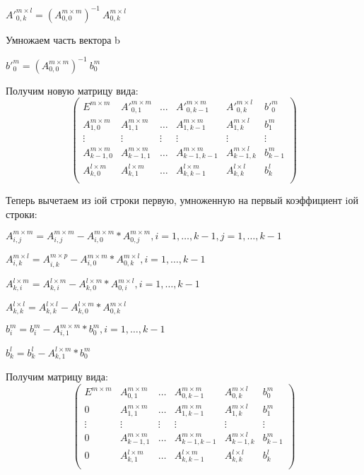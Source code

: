 \documentclass[12pt]{scrreprt}
\begin{document}
${A'}_{0, k}^{m \times l} = (A_{0, 0}^{m \times m})^{-1} \ A_{0, k}^{m \times l}$

Умножаем часть вектора b

${b'}_{0}^{m} = (A_{0, 0}^{m \times m})^{-1} \ b_{0}^{m}$

Получим новую матрицу вида:
\[ \left( \begin{matrix}
{E^{m \times m}} & {{A'}_{0, 1}^{m \times m}} & {\dots} & {{A'}_{0, k-1}^{m \times m}} & {{A'}_{0, k}^{m \times l}} & {{b'}_{0}^{m}} \\
{A_{1, 0}^{m \times m}} & {A_{1, 1}^{m \times m}} & {\dots} & {A_{1, k-1}^{m \times m}} & {A_{1, k}^{m \times l}} & {b_{1}^{m}} \\
{\vdots} & {\vdots} & {\vdots} & {\vdots} & {\vdots} & {\vdots} \\
{A_{k-1, 0}^{m \times m}} & {A_{k-1, 1}^{m \times m}} & {\dots} & {A_{k-1, k-1}^{m \times m}} & {A_{k-1, k}^{m \times l}} & {b_{k-1}^{m}} \\
{A_{k,0}^{l \times m}} & {A_{k,1}^{l \times m}} & {\dots} & {A_{k, k-1}^{l \times m}} & {A_{k, k}^{l \times l}} & {b_{k}^{l}}\\
\end{matrix}\right) \]


Теперь вычетаем из iой строки первую, умноженную на первый коэффициент iой строки:

\( A_{i,j}^{m \times m} = A_{i,j}^{m \times m} - A_{i,0}^{m \times m}*A_{0,j}^{m \times m}, i=1,\ldots,k-1,  j=1,\ldots,k-1 \)

\( A_{i,k}^{m \times l} = A_{i,k}^{m \times p} - A_{i,0}^{m \times m}*A_{0,k}^{m \times l}, i=1,\ldots,k-1\)

\( A_{k,i}^{l \times m} = A_{k,i}^{l \times m} - A_{k,0}^{l \times m}*A_{0,i}^{m \times l}, i=1,\ldots,k-1\)

\( A_{k,k}^{l \times l} = A_{k,k}^{l \times l} - A_{k,0}^{l \times m}*A_{0,k}^{m \times l}\)

\( b_{i}^{m} = b_{i}^{m} - A_{i,1}^{m \times m}*b_{0}^{m}, i=1,\ldots,k-1\)

\( b_{k}^{l} = b_{k}^{l} - A_{k,1}^{l \times m}*b_{0}^{m}\)

Получим матрицу вида:
\[ \left( \begin{matrix}
{E^{m \times m}} & {{A}_{0, 1}^{m \times m}} & {\dots} & {{A}_{0, k-1}^{m \times m}} & {{A}_{0, k}^{m \times l}} & {{b}_{0}^{m}} \\
{0} & {A_{1, 1}^{m \times m}} & {\dots} & {A_{1, k-1}^{m \times m}} & {A_{1, k}^{m \times l}} & {b_{1}^{m}} \\
{\vdots} & {\vdots} & {\vdots} & {\vdots} & {\vdots} & {\vdots} \\
{0} & {A_{k-1, 1}^{m \times m}} & {\dots} & {A_{k-1, k-1}^{m \times m}} & {A_{k-1, k}^{m \times l}} & {b_{k-1}^{m}} \\
{0} & {A_{k,1}^{l \times m}} & {\dots} & {A_{k, k-1}^{l \times m}} & {A_{k, k}^{l \times l}} & {b_{k}^{l}}\\
\end{matrix}\right) \]
\end{document}
